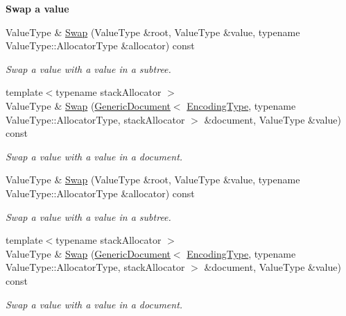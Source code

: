 \begin{Indent}{\bf Swap a value}\par
\begin{DoxyCompactItemize}
\item 
Value\+Type \& \hyperlink{class_generic_pointer_a25a063290bcf607694430d6b05ac9157}{Swap} (Value\+Type \&root, Value\+Type \&value, typename Value\+Type\+::\+Allocator\+Type \&allocator) const 
\begin{DoxyCompactList}\small\item\em Swap a value with a value in a subtree. \end{DoxyCompactList}\item 
{\footnotesize template$<$typename stack\+Allocator $>$ }\\Value\+Type \& \hyperlink{class_generic_pointer_a403b64d9a3ff51ba5f21b038838564bb}{Swap} (\hyperlink{class_generic_document}{Generic\+Document}$<$ \hyperlink{class_generic_pointer_a4b802da797a7a0b615fd9611cedb7c3b}{Encoding\+Type}, typename Value\+Type\+::\+Allocator\+Type, stack\+Allocator $>$ \&document, Value\+Type \&value) const \hypertarget{class_generic_pointer_a403b64d9a3ff51ba5f21b038838564bb}{}\label{class_generic_pointer_a403b64d9a3ff51ba5f21b038838564bb}

\begin{DoxyCompactList}\small\item\em Swap a value with a value in a document. \end{DoxyCompactList}\item 
Value\+Type \& \hyperlink{class_generic_pointer_a25a063290bcf607694430d6b05ac9157}{Swap} (Value\+Type \&root, Value\+Type \&value, typename Value\+Type\+::\+Allocator\+Type \&allocator) const 
\begin{DoxyCompactList}\small\item\em Swap a value with a value in a subtree. \end{DoxyCompactList}\item 
{\footnotesize template$<$typename stack\+Allocator $>$ }\\Value\+Type \& \hyperlink{class_generic_pointer_a403b64d9a3ff51ba5f21b038838564bb}{Swap} (\hyperlink{class_generic_document}{Generic\+Document}$<$ \hyperlink{class_generic_pointer_a4b802da797a7a0b615fd9611cedb7c3b}{Encoding\+Type}, typename Value\+Type\+::\+Allocator\+Type, stack\+Allocator $>$ \&document, Value\+Type \&value) const \hypertarget{class_generic_pointer_a403b64d9a3ff51ba5f21b038838564bb}{}\label{class_generic_pointer_a403b64d9a3ff51ba5f21b038838564bb}

\begin{DoxyCompactList}\small\item\em Swap a value with a value in a document. \end{DoxyCompactList}\end{DoxyCompactItemize}
\end{Indent}
